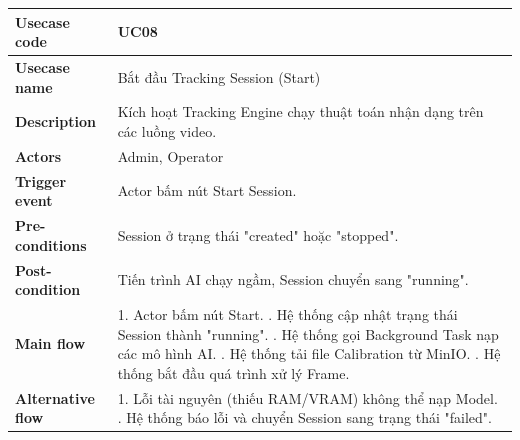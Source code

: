 \documentclass[12pt,a4paper]{article}
\begin{document}
\begin{table}[H]
\centering
\begin{tabular}{|l|p{12cm}|}
\hline
\textbf{Usecase code} & UC08 \\ \hline
\textbf{Usecase name} & Bắt đầu Tracking Session (Start) \\ \hline
\textbf{Description} & Kích hoạt Tracking Engine chạy thuật toán nhận dạng trên các luồng video. \\ \hline
\textbf{Actors} & Admin, Operator \\ \hline
\textbf{Trigger event} & Actor bấm nút Start Session. \\ \hline
\textbf{Pre-conditions} & Session ở trạng thái "created" hoặc "stopped". \\ \hline
\textbf{Post-condition} & Tiến trình AI chạy ngầm, Session chuyển sang "running". \\ \hline
\textbf{Main flow} & 
1. Actor bấm nút Start. \newline
2. Hệ thống cập nhật trạng thái Session thành "running". \newline
3. Hệ thống gọi Background Task nạp các mô hình AI. \newline
4. Hệ thống tải file Calibration từ MinIO. \newline
5. Hệ thống bắt đầu quá trình xử lý Frame. \\ \hline
\textbf{Alternative flow} & 
1. Lỗi tài nguyên (thiếu RAM/VRAM) không thể nạp Model. \newline
2. Hệ thống báo lỗi và chuyển Session sang trạng thái "failed". \\ \hline
\end{tabular}
\end{table}
\end{document}
